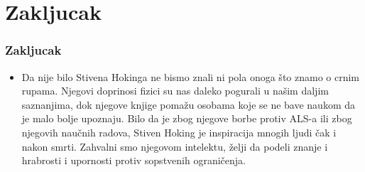 \documentclass{beamer}
\begin{document}
	\section{Zakljucak}
	\begin{frame}[fragile]\frametitle{Zakljucak}
	\begin{itemize}	 \fontsize{9}{6}\selectfont	
	\item  Da nije bilo Stivena Hokinga ne bismo znali ni pola onoga što znamo o crnim rupama. Njegovi doprinosi fizici su nas daleko pogurali u našim daljim saznanjima, dok njegove knjige pomažu osobama koje se ne bave naukom da je malo bolje upoznaju. Bilo da je zbog njegove borbe protiv ALS-a ili zbog njegovih naučnih radova, Stiven Hoking je inspiracija mnogih ljudi čak i nakon smrti. Zahvalni smo njegovom intelektu, želji da podeli znanje i hrabrosti i upornosti protiv sopstvenih ograničenja. 
	\end{itemize}
	\end{frame}
	
\end{document}
